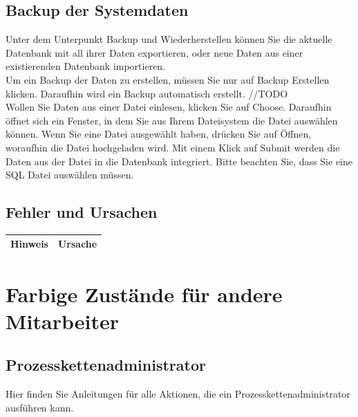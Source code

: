 \documentclass[enabledeprecatedfontcommands,fontsize=12pt,paper=a4,twoside]{scrartcl}
\begin{document}
\subsection{Backup der Systemdaten}
Unter dem Unterpunkt Backup und Wiederherstellen können Sie die aktuelle Datenbank mit all ihrer Daten exportieren, oder neue Daten aus einer existierenden Datenbank importieren. \\

Um ein Backup der Daten zu erstellen, müssen Sie nur auf Backup Erstellen klicken. Daraufhin wird ein Backup automatisch erstellt. //TODO \\

Wollen Sie Daten aus einer Datei einlesen, klicken Sie auf Choose. Daraufhin öffnet sich ein Fenster, in dem Sie aus Ihrem Dateisystem die Datei auswählen können. Wenn Sie eine Datei ausgewählt haben, drücken Sie auf Öffnen, woraufhin die Datei hochgeladen wird. Mit einem Klick auf Submit werden die Daten aus der Datei in die Datenbank integriert. Bitte beachten Sie, dass  Sie eine SQL Datei auswählen müssen. \\ 

\subsection{Fehler und Ursachen}
\begin{longtable}[c]{|p{5cm}|p{10cm}|}
\hline
\multicolumn{1}{|c|}{\textbf{Hinweis}}                          & \multicolumn{1}{c|}{\textbf{Ursache}}                                                                                                                                                                                                               \\ \hline
\endhead

\end{longtable}

\newpage
\section{Farbige Zustände für andere Mitarbeiter}
\subsection{Prozesskettenadministrator}

Hier finden Sie Anleitungen für alle Aktionen, die ein Prozesskettenadministrator ausführen kann.
\end{document}
